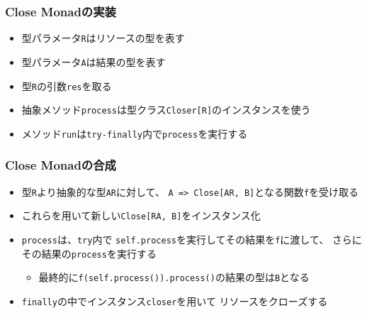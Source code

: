 \begin{frame}
  
\end{frame}

\begin{frame}
  \frametitle{Close Monadの実装}

  

  \begin{itemize}
    \item<2-> 型パラメータ\lstinline|R|はリソースの型を表す
    \item<3-> 型パラメータ\lstinline|A|は結果の型を表す
    \item<4-> 型\lstinline|R|の引数\lstinline|res|を取る
    \item<5-> 抽象メソッド\lstinline|process|は型クラス\lstinline|Closer[R]|のインスタンスを使う
    \item<6-> メソッド\lstinline|run|は\lstinline|try-finally|内で\lstinline|process|を実行する
  \end{itemize}
\end{frame}

\begin{frame}
  \frametitle{Close Monadの合成}

  

  \begin{itemize}
    \item<2-> 型\lstinline|R|より抽象的な型\lstinline|AR|に対して、
    \lstinline|A => Close[AR, B]|となる関数\lstinline|f|を受け取る
    \item<3-> これらを用いて新しい\lstinline|Close[RA, B]|をインスタンス化
    \item<4-> \lstinline|process|は、\lstinline|try|内で
    \lstinline|self.process|を実行してその結果を\lstinline|f|に渡して、
    さらにその結果の\lstinline|process|を実行する
    \begin{itemize}
      \item<5-> 最終的に\lstinline|f(self.process()).process()|の結果の型は\lstinline|B|となる
    \end{itemize}
    \item<6-> \lstinline|finally|の中でインスタンス\lstinline|closer|を用いて
    リソースをクローズする
  \end{itemize}
\end{frame}


